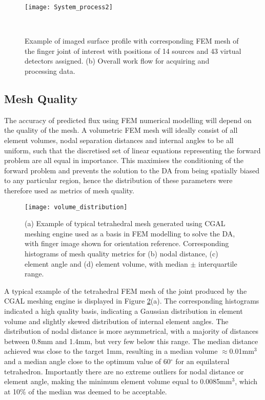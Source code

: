 \documentclass[twoside]{bhamthesis}
\theoremstyle{definition}
\begin{document}
\begin{figure}[!ht]
\texttt{[image: System\_process2]}
\centering
\caption{Example of imaged surface profile with corresponding FEM mesh of the finger joint of interest with positions of 14 sources and 43 virtual detectors assigned. (b) Overall work flow for acquiring and processing data.}
  \label{fig:System_process2}\
\end{figure}


\subsection{Mesh Quality}

The accuracy of predicted flux using FEM numerical modelling will depend on the quality of the mesh. A volumetric FEM mesh will ideally consist of all element volumes, nodal separation distances and internal angles to be all uniform, such that the discretised set of linear equations representing the forward problem are all equal in importance. This maximises the conditioning of the forward problem and prevents the solution to the DA from being spatially biased to any particular region, hence the distribution of these parameters were therefore used as metrics of mesh quality.

\begin{figure}[!ht]
\texttt{[image: volume\_distribution]}
\centering
\caption{(a) Example of typical tetrahedral mesh generated using CGAL meshing engine used as a basis in FEM modelling to solve the DA, with finger image shown for orientation reference. Corresponding histograms of mesh quality metrics for (b) nodal distance, (c) element angle and (d) element volume, with median $\pm$ interquartile range.}
\centering
\label{volume_distribution}
\end{figure}

A typical example of the tetrahedral FEM mesh of the joint produced by the CGAL meshing engine is displayed in Figure \ref{volume_distribution}(a). The corresponding histograms indicated a high quality basis, indicating a Gaussian distribution in element volume and slightly skewed distribution of internal element angles. The distribution of nodal distance is more asymmetrical, with a majority of distances between 0.8mm and 1.4mm, but very few below this range. The median distance achieved was close to the target 1mm, resulting in a median volume $\approx$0.01mm$^3$ and a median angle close to the optimum value of 60$^{\circ}$ for an equilateral tetrahedron. Importantly there are no extreme outliers for nodal distance or element angle, making the minimum element volume equal to 0.0085mm$^3$, which  at 10\% of the median was deemed to be acceptable.
\end{document}
